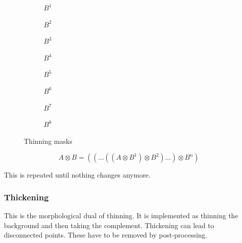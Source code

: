 \begin{figure}[h]
	\centering
	\begin{subfigure}[b]{0.1\textwidth}
		\centering
		\caption{$B^1$}
	\end{subfigure}
	\begin{subfigure}[b]{0.1\textwidth}
		\centering
		\caption{$B^2$}
	\end{subfigure}
	\begin{subfigure}[b]{0.1\textwidth}
		\centering
		\caption{$B^3$}
	\end{subfigure}
	\begin{subfigure}[b]{0.1\textwidth}
		\centering
		\caption{$B^4$}
	\end{subfigure}
	\begin{subfigure}[b]{0.1\textwidth}
		\centering
		\caption{$B^5$}
	\end{subfigure}
	\begin{subfigure}[b]{0.1\textwidth}
		\centering
		\caption{$B^6$}
	\end{subfigure}
	\begin{subfigure}[b]{0.1\textwidth}
		\centering
		\caption{$B^7$}
	\end{subfigure}
	\begin{subfigure}[b]{0.1\textwidth}
		\centering
		\caption{$B^8$}
	\end{subfigure}
	\caption{Thinning masks}
\end{figure}
	\[
		A \otimes  {B} = ((\ldots((A \otimes B^{1}) \otimes B^{2})\ldots) \otimes B^{n})
	\]

This is repeated until nothing changes anymore.

\subsubsection{Thickening}
This is the morphological dual of thinning. It is implemented as thinning the background and then taking the complement.
Thickening can lead to disconnected points. These have to be removed by post-processing.

